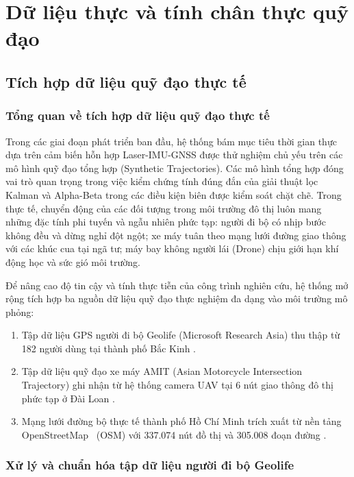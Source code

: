 \section{Dữ liệu thực và tính chân thực quỹ đạo}

\subsection{Tích hợp dữ liệu quỹ đạo thực tế}

\subsubsection{Tổng quan về tích hợp dữ liệu quỹ đạo thực tế}

\hspace{0.5cm} Trong các giai đoạn phát triển ban đầu, hệ thống bám mục tiêu thời gian thực dựa trên cảm biến hỗn hợp Laser-IMU-GNSS được thử nghiệm chủ yếu trên các mô hình quỹ đạo tổng hợp (Synthetic Trajectories). Các mô hình tổng hợp đóng vai trò quan trọng trong việc kiểm chứng tính đúng đắn của giải thuật lọc Kalman và Alpha-Beta trong các điều kiện biên được kiểm soát chặt chẽ. Trong thực tế, chuyển động của các đối tượng trong môi trường đô thị luôn mang những đặc tính phi tuyến và ngẫu nhiên phức tạp: người đi bộ có nhịp bước không đều và dừng nghỉ đột ngột; xe máy tuân theo mạng lưới đường giao thông với các khúc cua tại ngã tư; máy bay không người lái (Drone) chịu giới hạn khí động học và sức gió môi trường.

Để nâng cao độ tin cậy và tính thực tiễn của công trình nghiên cứu, hệ thống mở rộng tích hợp ba nguồn dữ liệu quỹ đạo thực nghiệm đa dạng vào môi trường mô phỏng:
\begin{enumerate}
    \item Tập dữ liệu GPS người đi bộ Geolife (Microsoft Research Asia) thu thập từ 182 người dùng tại thành phố Bắc Kinh \cite{zheng2008geolife}.
    \item Tập dữ liệu quỹ đạo xe máy AMIT (Asian Motorcycle Intersection Trajectory) ghi nhận từ hệ thống camera UAV tại 6 nút giao thông đô thị phức tạp ở Đài Loan \cite{wong2024amit}.
    \item Mạng lưới đường bộ thực tế thành phố Hồ Chí Minh trích xuất từ nền tảng OpenStreetMap~\cite{haklay2008openstreetmap} (OSM) với 337.074 nút đồ thị và 305.008 đoạn đường \cite{boeing2017osmnx}.
\end{enumerate}

\subsubsection{Xử lý và chuẩn hóa tập dữ liệu người đi bộ Geolife}

